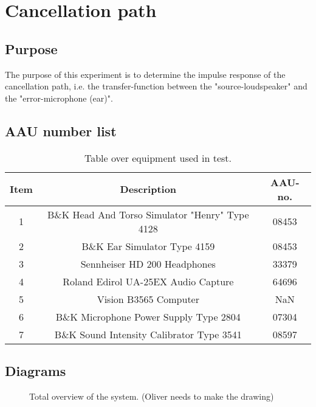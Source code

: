 \section{Cancellation path} \label{sec:CPjournal}
\subsection{Purpose}
The purpose of this experiment is to determine the impulse response of the cancellation path, i.e. the transfer-function between the "source-loudspeaker" and the "error-microphone (ear)".
		
\subsection{AAU number list}
\begin{table}[h]
	\centering
	\begin{tabular}{ c c c } \toprule
		{Item}	& {Description} 						& {AAU-no}. \\ \bottomrule 
		1	&	B\&K Head And Torso Simulator "Henry" Type 4128	& 08453		\\
		2	&	B\&K Ear Simulator Type 4159			& 08453		\\
		3	&	Sennheiser HD 200	Headphones			& 33379		\\
		4	&	Roland Edirol UA-25EX Audio Capture		& 64696		\\
		5	&	Vision B3565 Computer					& NaN		\\
		6	&	B\&K Microphone Power Supply Type 2804	& 07304		\\
		7	&	B\&K Sound Intensity Calibrator Type 3541	& 08597	\\ \bottomrule
	\end{tabular}
	\caption{Table over equipment used in test.}
	\label{tab:UsedEquipmentListningCP}
\end{table}

\subsection{Diagrams}
\begin{figure}[H]
	\centering
	
	\caption{Total overview of the system. (Oliver needs to make the drawing)}
	\label{SchematicOverview}
\end{figure}

